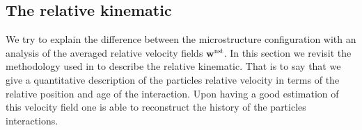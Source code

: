 \subsection{The relative kinematic}


We try to explain the difference between the microstructure configuration with an analysis of the averaged relative velocity fields $\textbf{w}^\text{nst}$. 
In this section we revisit the methodology used in \citet{zhang2023evolution} to describe the relative kinematic. 
That is to say that we give a quantitative description of the particles relative velocity in terms of the relative position and age of the interaction. 
Upon having a good estimation of this velocity field one is able to reconstruct the history of the particles interactions. 


